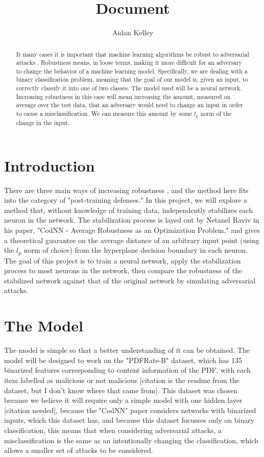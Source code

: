 \documentclass{article}
\title{Document}
\author{Aidan Kelley}
\DeclareMathOperator{\1}{\mathbb{1}}
\begin{document}
\maketitle

\begin{abstract}

It many cases it is important that machine learning algorithms be robust to adversarial attacks \cite[abstract]{vorobook}. Robustness means, in loose terms, making it more difficult for an adversary to change the behavior of a machine learning model. Specifically, we are dealing with a binary classification problem, meaning that the goal of our model is, given an input, to correctly classify it into one of two classes. The model used will be a neural network. Increasing robustness in this case will mean increasing the amount, measured on average over the test data, that an adversary would need to change an input in order to cause a misclassification. We can measure this amount by some $l_p$ norm of the change in the input.

\end{abstract}

\section{Introduction}

There are three main ways of increasing robustness \cite{ecocpaper}, and the method here fits into the category of "post-training defenses." In this project, we will explore a method that, without knowledge of training data, independently stabilizes each neuron in the network. The stabilization process is layed out by Netanel Raviv in his paper, "CodNN - Average Robustness as an Optimization Problem," \nocite{cod2} and gives a theoretical guarantee on the average distance of an arbitrary input point (using the $l_p$ norm of choice) from the hyperplane decision boundary in each neuron. The goal of this project is to train a neural network, apply the stabilization process to most neurons in the network, then compare the robustness of the stabilized network against that of the original network by simulating adversarial attacks.

\section{The Model}

The model is simple so that a better understanding of it can be obtained. The model will be designed to work on the "PDFRate-B" dataset, which has 135 binarized features corresponding to content information of the PDF, with each item labelled as malicious or not malicious [citation is the readme from the dataset, but I don't know where that came from]. This dataset was chosen because we believe it will require only a simple model with one hidden layer [citation needed], because the "CodNN" paper considers networks with binarized inputs, which this dataset has, and because this dataset focusses only on binary classification, this means that when considering adversarial attacks, a misclassification is the same as an intentionally changing the classification, which allows a smaller set of attacks to be considered.
\end{document}
